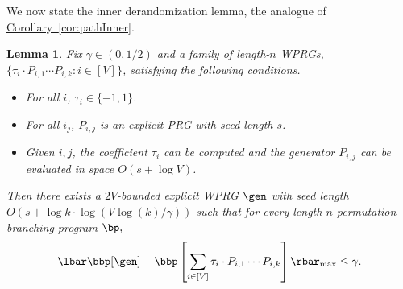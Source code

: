 \documentclass[11pt]{article}
\newcommand{\expref}[2]{\texorpdfstring{\hyperref[#2]{#1~\ref{#2}}}{#1~\ref{#2}}}
\newtheorem{lemma}[theorem]{Lemma}
\begin{document}
We now state the inner derandomization lemma, the analogue of \expref{Corollary}{cor:pathInner}.
\begin{lemma}\label{lem:cycleInner}
Fix $\gamma\in(0,1/2)$ and a family of length-$n$ WPRGs, %
%
 $\{\tau_i\cdot  P_{i,1}\cdots P_{i,k}:i\in [V]\}$, satisfying the following 
%
conditions.  %
\begin{itemize}
    \item For all $i$, $\tau_i\in \{-1,1\}$.
    \item For all $i_j$, $P_{i,j}$ is an explicit PRG with seed length $s$.
    \item Given $i,j$, the coefficient $\tau_i$ can be computed and the generator $P_{i,j}$ can be evaluated in space $O(s+\log V)$.
\end{itemize}
Then there exists a $2V$-bounded explicit WPRG $\gen$ with seed length $O(s+ \log k\cdot \log(V\log(k)/\gamma))$ such that for every length-$n$ permutation branching program $\bp,$
$$\lbar\bbp[\gen]- \bbp\left[\sum_{i\in[V]}\tau_i \cdot P_{i,1}\cdots P_{i,k}\right]\rbar_{\max} \leq \gamma.$$
\end{lemma}
\end{document}
